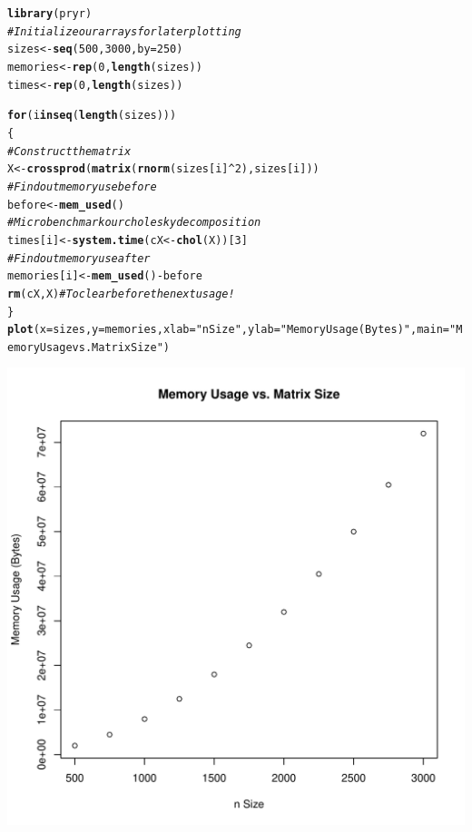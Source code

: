 \documentclass{article}\usepackage[]{graphicx}\usepackage[]{color}
\makeatletter
\def\maxwidth{ %
  \ifdim\Gin@nat@width>\linewidth
    \linewidth
  \else
    \Gin@nat@width
  \fi
}
\newcommand{\hlnum}[1]{\textcolor[rgb]{0.686,0.059,0.569}{#1}}%
\newcommand{\hlstr}[1]{\textcolor[rgb]{0.192,0.494,0.8}{#1}}%
\newcommand{\hlcom}[1]{\textcolor[rgb]{0.678,0.584,0.686}{\textit{#1}}}%
\newcommand{\hlopt}[1]{\textcolor[rgb]{0,0,0}{#1}}%
\newcommand{\hlstd}[1]{\textcolor[rgb]{0.345,0.345,0.345}{#1}}%
\newcommand{\hlkwa}[1]{\textcolor[rgb]{0.161,0.373,0.58}{\textbf{#1}}}%
\newcommand{\hlkwb}[1]{\textcolor[rgb]{0.69,0.353,0.396}{#1}}%
\newcommand{\hlkwc}[1]{\textcolor[rgb]{0.333,0.667,0.333}{#1}}%
\newcommand{\hlkwd}[1]{\textcolor[rgb]{0.737,0.353,0.396}{\textbf{#1}}}%
\newenvironment{kframe}{%
 \def\at@end@of@kframe{}%
 \ifinner\ifhmode%
  \def\at@end@of@kframe{\end{minipage}}%
  \begin{minipage}{\columnwidth}%
 \fi\fi%
 \def\FrameCommand##1{\hskip\@totalleftmargin \hskip-\fboxsep
 \colorbox{shadecolor}{##1}\hskip-\fboxsep
     \hskip-\linewidth \hskip-\@totalleftmargin \hskip\columnwidth}%
 \MakeFramed {\advance\hsize-\width
   \@totalleftmargin\z@ \linewidth\hsize
   \@setminipage}}%
 {\par\unskip\endMakeFramed%
 \at@end@of@kframe}
\newenvironment{knitrout}{}{} %
\makeatother
\begin{document}
\begin{knitrout}
\color{fgcolor}\begin{kframe}
\begin{alltt}
\hlkwd{library}\hlstd{(pryr)}
\hlcom{# Initialize our arrays for later plotting}
\hlstd{sizes} \hlkwb{<-} \hlkwd{seq}\hlstd{(}\hlnum{500}\hlstd{,}\hlnum{3000}\hlstd{,}\hlkwc{by}\hlstd{=}\hlnum{250}\hlstd{)}
\hlstd{memories} \hlkwb{<-} \hlkwd{rep}\hlstd{(}\hlnum{0}\hlstd{,}\hlkwd{length}\hlstd{(sizes))}
\hlstd{times} \hlkwb{<-} \hlkwd{rep}\hlstd{(}\hlnum{0}\hlstd{,}\hlkwd{length}\hlstd{(sizes))}

\hlkwa{for} \hlstd{(i} \hlkwa{in} \hlkwd{seq}\hlstd{(}\hlkwd{length}\hlstd{(sizes)))}
\hlstd{\{}
    \hlcom{# Construct the matrix}
    \hlstd{X} \hlkwb{<-} \hlkwd{crossprod}\hlstd{(}\hlkwd{matrix}\hlstd{(}\hlkwd{rnorm}\hlstd{(sizes[i]}\hlopt{^}\hlnum{2}\hlstd{), sizes[i]))}
    \hlcom{# Find out memory use before}
    \hlstd{before} \hlkwb{<-} \hlkwd{mem_used}\hlstd{()}
    \hlcom{# Microbenchmark our cholesky decomposition}
    \hlstd{times[i]} \hlkwb{<-} \hlkwd{system.time}\hlstd{(cX} \hlkwb{<-} \hlkwd{chol}\hlstd{(X))[}\hlnum{3}\hlstd{]}
    \hlcom{# Find out memory use after}
    \hlstd{memories[i]} \hlkwb{<-} \hlkwd{mem_used}\hlstd{()} \hlopt{-} \hlstd{before}
    \hlkwd{rm}\hlstd{(cX,X)} \hlcom{# To clear before the next usage!}
\hlstd{\}}
\hlkwd{plot}\hlstd{(}\hlkwc{x}\hlstd{=sizes,}\hlkwc{y}\hlstd{=memories,}\hlkwc{xlab}\hlstd{=}\hlstr{"n Size"}\hlstd{,}\hlkwc{ylab}\hlstd{=}\hlstr{"Memory Usage (Bytes)"}\hlstd{,}\hlkwc{main}\hlstd{=}\hlstr{"Memory Usage vs. Matrix Size"}\hlstd{)}
\end{alltt}
\end{kframe}
\includegraphics[width=\maxwidth]{figure/unnamed-chunk-1-1} 

\end{knitrout}
\end{document}
